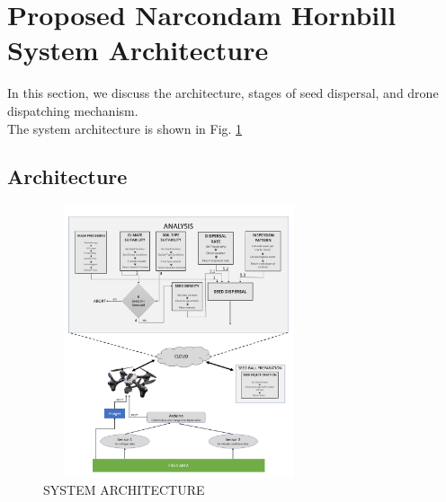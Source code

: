 \documentclass[conference]{IEEEtran}
\begin{document}
\section{Proposed Narcondam Hornbill System Architecture}

In this section, we discuss the architecture, stages of seed dispersal, and drone dispatching mechanism.
\\The system architecture is shown in Fig. \ref{sa}
\subsection{Architecture}

\begin{figure}[htp]
    \centering
    \includegraphics[width=8cm,height=8cm]{architecture_ml.png}
    \caption{SYSTEM ARCHITECTURE}
    \label{sa}
\end{figure}
\end{document}
